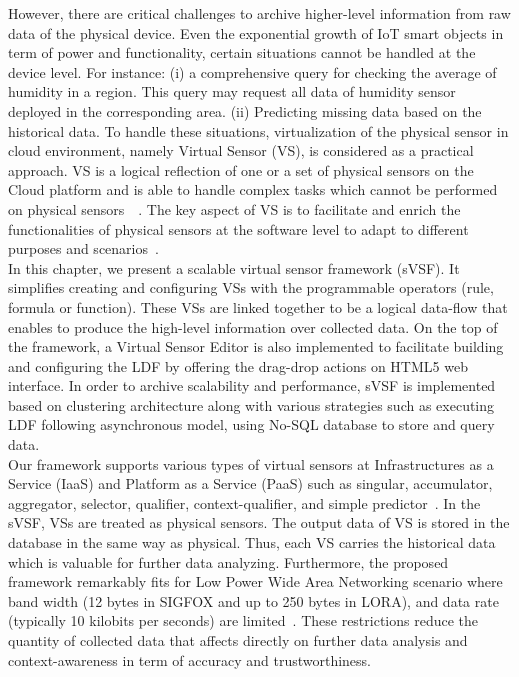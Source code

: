 However, there are critical challenges to archive higher-level information from raw data of the physical device. Even the exponential growth of IoT smart objects in term of power and functionality, certain situations cannot be handled at the device level. For instance: (i) a comprehensive query for checking the average of humidity in a region. This query may request all data of humidity sensor deployed in the corresponding area. (ii) Predicting missing data based on the historical data. To handle these situations, virtualization of the physical sensor in cloud environment, namely Virtual Sensor (VS), is considered as a practical approach. VS is a logical reflection of one or a set of physical sensors on the Cloud platform and is able to handle complex tasks which cannot be performed on physical sensors~\cite{Julien2006}~\cite{Crowcroft2012}. The key aspect of VS is to facilitate and enrich the functionalities of physical sensors at the software level to adapt to different purposes and scenarios~\cite{GuptaMukherjee2016}. \\

In this chapter, we present a scalable virtual sensor framework (sVSF). It simplifies creating and configuring VSs with the programmable operators (rule, formula or function). These VSs are linked together to be a logical data-flow that enables to produce the high-level information over collected data. On the top of the framework, a Virtual Sensor Editor  is also implemented to facilitate building and configuring the LDF by offering the drag-drop actions on HTML5 web interface. In order to archive scalability and performance, sVSF is implemented based on clustering architecture along with various strategies such as executing LDF following asynchronous model, using No-SQL database to store and query data. \\

Our framework supports various types of virtual sensors at Infrastructures as a Service (IaaS) and Platform as a Service (PaaS) such as singular, accumulator, aggregator, selector, qualifier, context-qualifier, and simple predictor~\cite{SBoseAGuptaSAdhikaryN2015}. In the sVSF, VSs are treated as physical sensors. The output data of VS is stored in the database in the same way as physical. Thus, each VS carries the historical data which is valuable for further data analyzing. Furthermore, the proposed framework remarkably fits for Low Power Wide Area Networking scenario where band width (12 bytes in SIGFOX and up to 250 bytes in LORA), and data rate (typically 10 kilobits per seconds) are limited~\cite{AdelantadoVilajosanaTusetMartinezMeliaSegui2017}. These restrictions reduce the quantity of collected data that affects directly on further data analysis and context-awareness in term of accuracy and trustworthiness. \\

